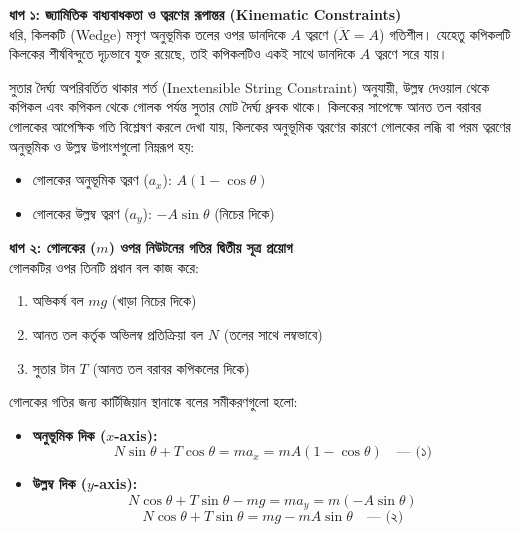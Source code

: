 \documentclass[12pt, a4paper]{article}
\begin{document}
\begin{tcolorbox}[solutionbox={সমাধান (Solution)}]
\noindent
\textbf{ধাপ ১: জ্যামিতিক বাধ্যবাধকতা ও ত্বরণের রূপান্তর (Kinematic Constraints)} \\
ধরি, কিলকটি (Wedge) মসৃণ অনুভূমিক তলের ওপর ডানদিকে $A$ ত্বরণে ($\ddot{X} = A$) গতিশীল। যেহেতু কপিকলটি কিলকের শীর্ষবিন্দুতে দৃঢ়ভাবে যুক্ত রয়েছে, তাই কপিকলটিও একই সাথে ডানদিকে $A$ ত্বরণে সরে যায়। 

সুতার দৈর্ঘ্য অপরিবর্তিত থাকার শর্ত (Inextensible String Constraint) অনুযায়ী, উল্লম্ব দেওয়াল থেকে কপিকল এবং কপিকল থেকে গোলক পর্যন্ত সুতার মোট দৈর্ঘ্য ধ্রুবক থাকে। কিলকের সাপেক্ষে আনত তল বরাবর গোলকের আপেক্ষিক গতি বিশ্লেষণ করলে দেখা যায়, কিলকের অনুভূমিক ত্বরণের কারণে গোলকের লব্ধি বা পরম ত্বরণের অনুভূমিক ও উল্লম্ব উপাংশগুলো নিম্নরূপ হয়:
\begin{itemize}[label={--}, leftmargin=1cm, itemsep=0.2em]
    \item গোলকের অনুভূমিক ত্বরণ ($a_x$): $A(1 - \cos\theta)$
    \item গোলকের উল্লম্ব ত্বরণ ($a_y$): $-A\sin\theta$ (নিচের দিকে)
\end{itemize}

\vspace{0.5em}
\noindent
\textbf{ধাপ ২: গোলকের ($m$) ওপর নিউটনের গতির দ্বিতীয় সূত্র প্রয়োগ} \\
গোলকটির ওপর তিনটি প্রধান বল কাজ করে:
\begin{enumerate}[label=(\roman*), leftmargin=1cm, itemsep=0.2em]
    \item অভিকর্ষ বল $mg$ (খাড়া নিচের দিকে)
    \item আনত তল কর্তৃক অভিলম্ব প্রতিক্রিয়া বল $N$ (তলের সাথে লম্বভাবে)
    \item সুতার টান $T$ (আনত তল বরাবর কপিকলের দিকে)
\end{enumerate}

গোলকের গতির জন্য কার্টিজিয়ান স্থানাঙ্কে বলের সমীকরণগুলো হলো:
\begin{itemize}
    \item \textbf{অনুভূমিক দিক ($x$-axis):}
    \[ N\sin\theta + T\cos\theta = m a_x = m A(1 - \cos\theta) \quad \text{--- (১)} \]
    \item \textbf{উল্লম্ব দিক ($y$-axis):}
    \[ N\cos\theta + T\sin\theta - mg = m a_y = m(-A\sin\theta) \]
    \[ N\cos\theta + T\sin\theta = mg - mA\sin\theta \quad \text{--- (২)} \]
\end{itemize}


\end{tcolorbox}
\end{document}
